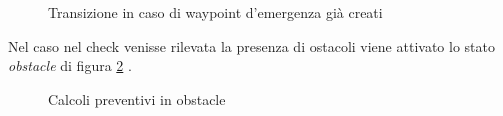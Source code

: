 \documentclass{article}
\begin{document}
            \begin{figure} [ht]
                \caption{Transizione in caso di waypoint d'emergenza già creati}
                \label{fig:sx}
            \end{figure}

            Nel caso nel check venisse rilevata la presenza di ostacoli viene attivato lo stato \emph{obstacle} di figura \ref{fig:obs} .

            \begin{figure} [ht]
                \caption{Calcoli preventivi in obstacle}
                \label{fig:obs}
            \end{figure}
\end{document}
